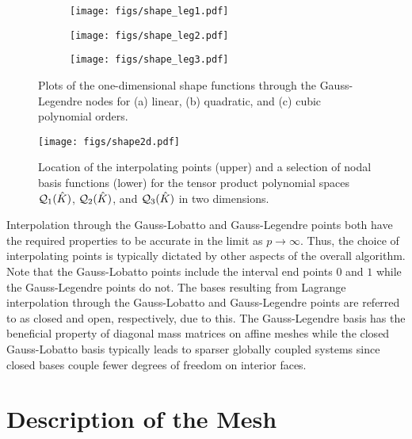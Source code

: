 \documentclass[../doc.tex]{subfiles}
\begin{document}
\begin{figure}
\centering
\begin{subfigure}{.30\textwidth}
	\centering
	\texttt{[image: figs/shape\_leg1.pdf]}
	\caption{}
\end{subfigure}
\begin{subfigure}{.30\textwidth}
	\centering
	\texttt{[image: figs/shape\_leg2.pdf]}
	\caption{}
\end{subfigure}
\begin{subfigure}{.30\textwidth}
	\centering
	\texttt{[image: figs/shape\_leg3.pdf]}
	\caption{}
\end{subfigure}
\caption{Plots of the one-dimensional shape functions through the Gauss-Legendre nodes for (a) linear, (b) quadratic, and (c) cubic polynomial orders.}
\label{fem:shape_leg1d}
\end{figure}

\begin{figure}
\centering
\texttt{[image: figs/shape2d.pdf]}
\caption{Location of the interpolating points (upper) and a selection of nodal basis functions (lower) for the tensor product polynomial spaces $\mathcal{Q}_{1}(\hat{K})$, $\mathcal{Q}_{2}(\hat{K})$, and $\mathcal{Q}_{3}(\hat{K})$ in two dimensions.}
\label{fem:shape2d}
\end{figure}

Interpolation through the Gauss-Lobatto and Gauss-Legendre points both have the required properties to be accurate in the limit as $p\rightarrow \infty$. Thus, the choice of interpolating points is typically dictated by other aspects of the overall algorithm. Note that the Gauss-Lobatto points include the interval end points $0$ and $1$ while the Gauss-Legendre points do not. The bases resulting from Lagrange interpolation through the Gauss-Lobatto and Gauss-Legendre points are referred to as closed and open, respectively, due to this. The Gauss-Legendre basis has the beneficial property of diagonal mass matrices on affine meshes while the closed Gauss-Lobatto basis typically leads to sparser globally coupled systems since closed bases couple fewer degrees of freedom on interior faces. 

\section{Description of the Mesh}
\end{document}
